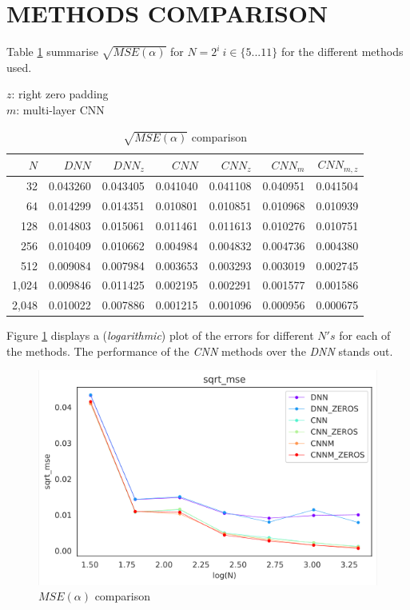 \documentclass[a4paper, 12pt]{report}
\begin{document}
\section{METHODS COMPARISON}
Table \ref{table:sqrt-mse-comparison} summarise $\sqrt{MSE(\alpha)}$ for $N=2^i~ i\in\{5...11\}$ for the different methods used.
\begin{table}[!htb]
    \sffamily
    \scriptsize
    \caption*{
        $z$: right zero padding\\
        $m$: multi-layer CNN
    }
    \centering
    \begin{tabular}{r r r r r r r} 
        $N$ & $DNN$ & $DNN_z$ & $CNN$ & $CNN_z$ & $CNN_m$ & $CNN_{m,z}$ \\
        \hline
        32 & 0.043260 & 0.043405 & 0.041040 & 0.041108 & 0.040951 & 0.041504 \\ 
        64 & 0.014299 & 0.014351 & 0.010801 & 0.010851 & 0.010968 & 0.010939 \\
        128 & 0.014803 & 0.015061 & 0.011461 & 0.011613 & 0.010276 & 0.010751 \\
        256 & 0.010409 & 0.010662 & 0.004984 & 0.004832 & 0.004736 & 0.004380 \\
        512 & 0.009084 & 0.007984 & 0.003653 & 0.003293 & 0.003019 & 0.002745 \\
        1,024 & 0.009846 & 0.011425 & 0.002195 & 0.002291 & 0.001577 & 0.001586 \\
        2,048 & 0.010022 & 0.007886 & 0.001215 & 0.001096 & 0.000956 & 0.000675 \\
    \end{tabular}
    \caption{$\sqrt{MSE(\alpha)}$ comparison}
    \label{table:sqrt-mse-comparison}
\end{table}

Figure \ref{fig:mse-alpha-comparison} displays a (\textit{logarithmic}) plot of the errors for different $N's$ for each of the methods. The performance of the \textit{CNN} methods over the \textit{DNN} stands out.
\begin{figure}[!ht]
\centering
\includegraphics[width=0.7\linewidth]{./sqrt_mse_compare}
\caption{$MSE(\alpha)$ comparison}
\label{fig:mse-alpha-comparison}
\end{figure}
\end{document}
